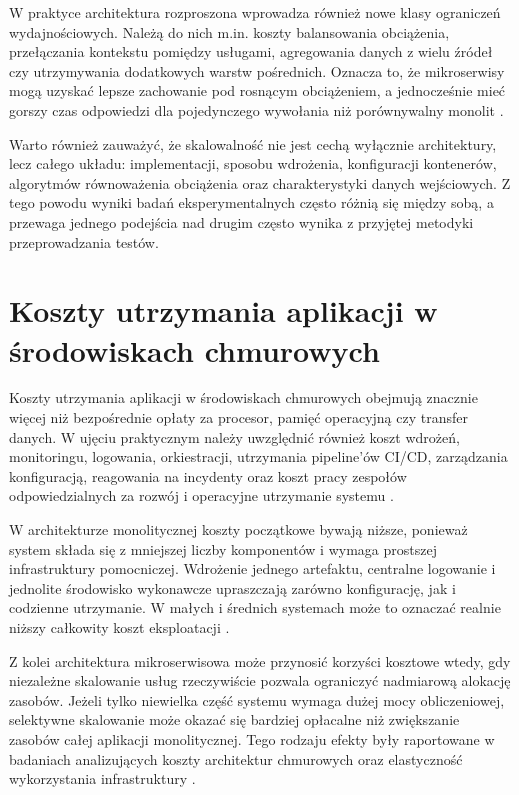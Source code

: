W praktyce architektura rozproszona wprowadza również nowe klasy ograniczeń wydajnościowych. Należą do nich m.in. koszty balansowania obciążenia, przełączania kontekstu pomiędzy usługami, agregowania danych z wielu źródeł czy utrzymywania dodatkowych warstw pośrednich. Oznacza to, że mikroserwisy mogą uzyskać lepsze zachowanie pod rosnącym obciążeniem, a jednocześnie mieć gorszy czas odpowiedzi dla pojedynczego wywołania niż porównywalny monolit \cite{rodrigues2025assessment}.

Warto również zauważyć, że skalowalność nie jest cechą wyłącznie architektury, lecz całego układu: implementacji, sposobu wdrożenia, konfiguracji kontenerów, algorytmów równoważenia obciążenia oraz charakterystyki danych wejściowych. Z tego powodu wyniki badań eksperymentalnych często różnią się między sobą, a przewaga jednego podejścia nad drugim często wynika z przyjętej metodyki przeprowadzania testów.

\section{Koszty utrzymania aplikacji w środowiskach chmurowych}
\label{sec:cloud-maintenance-costs}

Koszty utrzymania aplikacji w środowiskach chmurowych obejmują znacznie więcej niż bezpośrednie opłaty za procesor, pamięć operacyjną czy transfer danych. W ujęciu praktycznym należy uwzględnić również koszt wdrożeń, monitoringu, logowania, orkiestracji, utrzymania pipeline'ów CI/CD, zarządzania konfiguracją, reagowania na incydenty oraz koszt pracy zespołów odpowiedzialnych za rozwój i operacyjne utrzymanie systemu \cite{villamizar2017cost}.

W architekturze monolitycznej koszty początkowe bywają niższe, ponieważ system składa się z mniejszej liczby komponentów i wymaga prostszej infrastruktury pomocniczej. Wdrożenie jednego artefaktu, centralne logowanie i jednolite środowisko wykonawcze upraszczają zarówno konfigurację, jak i codzienne utrzymanie. W małych i średnich systemach może to oznaczać realnie niższy całkowity koszt eksploatacji \cite{mangwani2023evaluation}.

Z kolei architektura mikroserwisowa może przynosić korzyści kosztowe wtedy, gdy niezależne skalowanie usług rzeczywiście pozwala ograniczyć nadmiarową alokację zasobów. Jeżeli tylko niewielka część systemu wymaga dużej mocy obliczeniowej, selektywne skalowanie może okazać się bardziej opłacalne niż zwiększanie zasobów całej aplikacji monolitycznej. Tego rodzaju efekty były raportowane w badaniach analizujących koszty architektur chmurowych oraz elastyczność wykorzystania infrastruktury \cite{kader2025streaming}.

